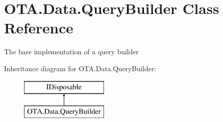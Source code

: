 \hypertarget{class_o_t_a_1_1_data_1_1_query_builder}{}\section{O\+T\+A.\+Data.\+Query\+Builder Class Reference}
\label{class_o_t_a_1_1_data_1_1_query_builder}


The bare implementation of a query builder  


Inheritance diagram for O\+T\+A.\+Data.\+Query\+Builder\+:\begin{figure}[H]
\begin{center}
\leavevmode
\includegraphics[height=2.000000cm]{class_o_t_a_1_1_data_1_1_query_builder}
\end{center}
\end{figure}
